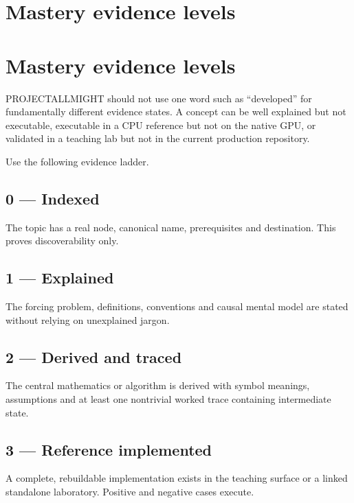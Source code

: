 \hypertarget{appendix-2a2e5bd7143a}{}
\section*{Mastery evidence levels}
\section{Mastery evidence levels}\label{mastery-evidence-levels}

PROJECTALLMIGHT should not use one word such as ``developed'' for fundamentally different evidence states. A concept can be well explained but not executable, executable in a CPU reference but not on the native GPU, or validated in a teaching lab but not in the current production repository.

Use the following evidence ladder.

\subsection{0 --- Indexed}\label{indexed}

The topic has a real node, canonical name, prerequisites and destination. This proves discoverability only.

\subsection{1 --- Explained}\label{explained}

The forcing problem, definitions, conventions and causal mental model are stated without relying on unexplained jargon.

\subsection{2 --- Derived and traced}\label{derived-and-traced}

The central mathematics or algorithm is derived with symbol meanings, assumptions and at least one nontrivial worked trace containing intermediate state.

\subsection{3 --- Reference implemented}\label{reference-implemented}

A complete, rebuildable implementation exists in the teaching surface or a linked standalone laboratory. Positive and negative cases execute.

